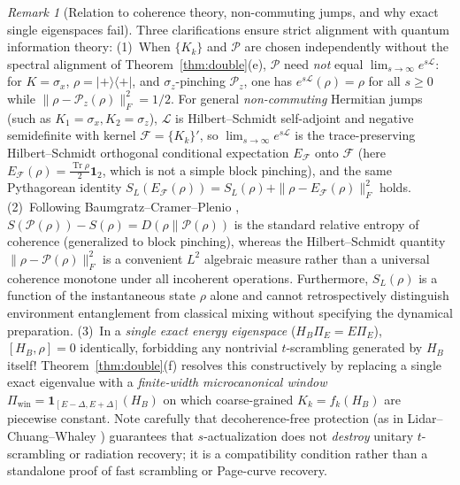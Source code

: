 \documentclass[11pt,a4paper]{article}
\theoremstyle{definition}
\theoremstyle{remark}
\newtheorem{remark}{Remark}
\newcommand{\Tr}{\operatorname{Tr}}
\newcommand{\cL}{\mathcal{L}}
\newcommand{\cP}{\mathcal{P}}
\newcommand{\cF}{\mathcal{F}}
\newcommand{\1}{\mathbf{1}}
\newcommand{\normF}[1]{\|#1\|_F}
\begin{document}
\begin{remark}[Relation to coherence theory, non-commuting jumps, and why exact single eigenspaces fail]\label{rem:coherence-window}
Three clarifications ensure strict alignment with quantum information theory:
(1)~When $\{K_k\}$ and $\cP$ are chosen independently without the spectral alignment of Theorem~\ref{thm:double}(e), $\cP$ need \emph{not} equal $\lim_{s\to\infty} e^{s\cL}$: for $K = \sigma_x$, $\rho = |+\rangle\langle +|$, and $\sigma_z$-pinching $\cP_z$, one has $e^{s\cL}(\rho) = \rho$ for all $s \ge 0$ while $\normF{\rho-\cP_z(\rho)}^2 = 1/2$. For general \emph{non-commuting} Hermitian jumps (such as $K_1=\sigma_x, K_2=\sigma_z$), $\cL$ is Hilbert--Schmidt self-adjoint and negative semidefinite with kernel $\cF = \{K_k\}'$, so $\lim_{s\to\infty} e^{s\cL}$ is the trace-preserving Hilbert--Schmidt orthogonal conditional expectation $E_{\cF}$ onto $\cF$ (here $E_{\cF}(\rho) = \frac{\Tr\rho}{2}\1_2$, which is not a simple block pinching), and the same Pythagorean identity $S_L(E_{\cF}(\rho)) = S_L(\rho) + \normF{\rho - E_{\cF}(\rho)}^2$ holds.
(2)~Following Baumgratz--Cramer--Plenio \cite{Baumgratz2014}, $S(\cP(\rho)) - S(\rho) = D(\rho\|\cP(\rho))$ is the standard relative entropy of coherence (generalized to block pinching), whereas the Hilbert--Schmidt quantity $\normF{\rho-\cP(\rho)}^2$ is a convenient $L^2$ algebraic measure rather than a universal coherence monotone under all incoherent operations. Furthermore, $S_L(\rho)$ is a function of the instantaneous state $\rho$ alone and cannot retrospectively distinguish environment entanglement from classical mixing without specifying the dynamical preparation.
(3)~In a \emph{single exact energy eigenspace} ($H_B\Pi_E = E\Pi_E$), $[H_B,\rho]=0$ identically, forbidding any nontrivial $t$-scrambling generated by $H_B$ itself! Theorem~\ref{thm:double}(f) resolves this constructively by replacing a single exact eigenvalue with a \emph{finite-width microcanonical window} $\Pi_{\mathrm{win}} = \1_{[E-\Delta, E+\Delta]}(H_B)$ on which coarse-grained $K_k = f_k(H_B)$ are piecewise constant. Note carefully that decoherence-free protection (as in Lidar--Chuang--Whaley \cite{Lidar1998}) guarantees that $s$-actualization does not \emph{destroy} unitary $t$-scrambling or radiation recovery; it is a compatibility condition rather than a standalone proof of fast scrambling or Page-curve recovery.
\end{remark}
\end{document}
